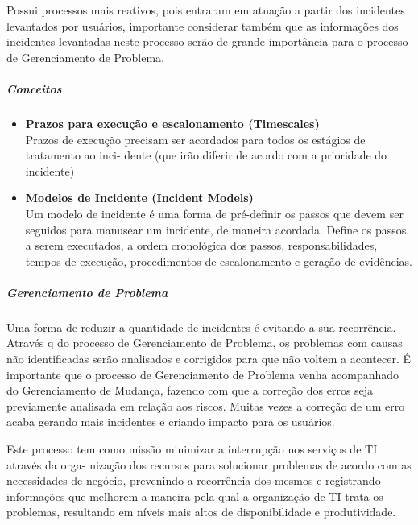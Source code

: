 \documentclass[11pt,a4paper]{article}
\begin{document}
Possui processos mais reativos, pois entraram em atuação a partir dos incidentes
levantados por usuários, importante considerar também que as informações dos
incidentes levantadas neste processo serão de grande importância para o processo
de Gerenciamento de Problema.


\subparagraph*{Conceitos}
\begin{itemize}[noitemsep]
	\item {\bfseries Prazos para execução e escalonamento (Timescales)} \\
		Prazos de execução precisam ser acordados para todos os estágios de tratamento ao inci-
		dente (que irão diferir de acordo com a prioridade do incidente)

	\item {\bfseries Modelos de Incidente (Incident Models) } \\
		Um modelo de incidente é uma forma de pré-definir os passos que devem ser seguidos
		para manusear um incidente, de maneira acordada. Define os passos a serem executados, a
		ordem cronológica dos passos, responsabilidades, tempos de execução, procedimentos de
		escalonamento e geração de evidências.

\end{itemize}


\subparagraph{Gerenciamento de Problema}
Uma forma de reduzir a quantidade de incidentes é evitando a sua recorrência. Através q
do processo de Gerenciamento de Problema, os problemas com causas não identificadas
serão analisados e corrigidos para que não voltem a acontecer.
É importante que o processo de Gerenciamento de Problema venha acompanhado do
Gerenciamento de Mudança, fazendo com que a correção dos erros seja previamente
analisada em relação aos riscos. Muitas vezes a correção de um erro acaba gerando mais
incidentes e criando impacto para os usuários.

Este processo tem como missão minimizar a interrupção nos serviços de TI através da orga-
nização dos recursos para solucionar problemas de acordo com as necessidades de negócio,
prevenindo a recorrência dos mesmos e registrando informações que melhorem a maneira
pela qual a organização de TI trata os problemas, resultando em níveis mais altos de disponibilidade e produtividade.
\end{document}
